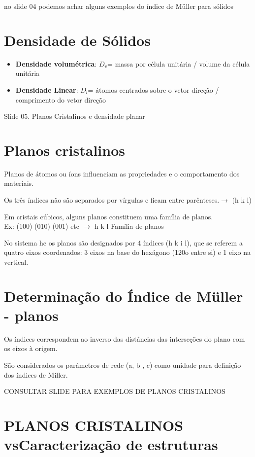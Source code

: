 {\large no slide 04 podemos achar alguns exemplos do índice de Müller para sólidos}


\section{Densidade de Sólidos}





\begin{itemize}
	\item \textbf{Densidade volumétrica}: $D_{v}$= massa por célula unitária / volume da célula unitária
	\item \textbf{Densidade Linear}: $D_{l}$= átomos centrados sobre o vetor direção / comprimento do vetor direção
\end{itemize}


{\large Slide 05. Planos Cristalinos e densidade planar}

\section{Planos cristalinos}
\noindent

Planos de átomos ou íons influenciam as propriedades e o comportamento dos materiais.

Os três índices não são separados por vírgulas e ficam entre parênteses.$\rightarrow$ (h k l)

Em cristais cúbicos, alguns planos constituem uma família de planos. \\ Ex: (100) (010) (001) etc $\rightarrow$ { h k l } Família de planos

No sistema hc os planos são designados por 4 índices (h k i l), que se referem a quatro eixos coordenados: 3 eixos na base do hexágono (120o entre si) e 1 eixo na vertical.


\section{Determinação do Índice de Müller - planos}


Os índices correspondem ao inverso das distâncias das interseções do plano com os eixos à origem.

São considerados os parâmetros de rede (a, b , c) como unidade para definição dos índices de Miller.

{\large CONSULTAR SLIDE PARA EXEMPLOS DE PLANOS CRISTALINOS}


\section{PLANOS CRISTALINOS vsCaracterização de estruturas}


